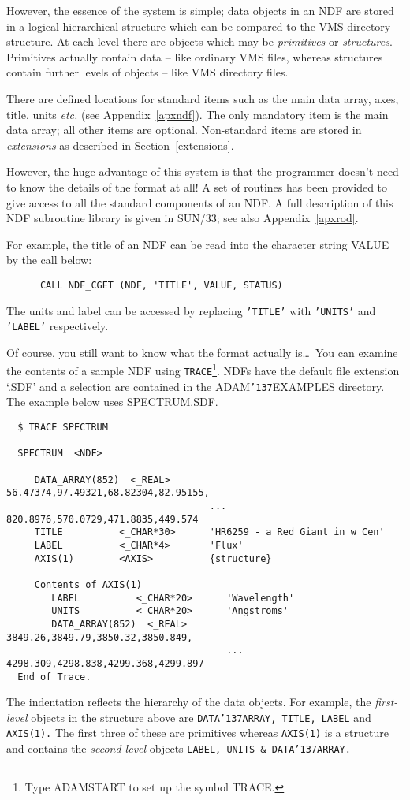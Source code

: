 \documentclass[twoside,11pt]{article}
\renewcommand{\_}{{\tt\char'137}}
\newcommand{\xref}[3]{#1}
\begin{document}
However, the essence of the system is simple; data objects in an NDF 
are stored in a 
logical hierarchical structure which can be compared to the VMS 
directory structure.
At each level there are objects which may be {\sl primitives\/}
or {\sl structures}.
Primitives actually contain data -- like ordinary VMS files, whereas
structures contain further levels of objects -- like VMS directory files.

There are defined locations for standard items such as the main data array,
axes, title, units {\it etc.} (see Appendix~\ref{apxndf}).
The only mandatory item is the main data 
array; all other items are optional. 
Non-standard items are stored in {\sl extensions\/} 
as described in Section~\ref{extensions}.

However, the huge advantage of this system is that the programmer  
doesn't need to know the details of the
format at all!
A set of routines has been provided to give access
to all the standard components of an NDF.
A full description of this NDF subroutine library is given in
\xref{SUN/33}{sun33}{};
see also Appendix~\ref{apxrod}.


For example, the title of an NDF can be read into the character string 
VALUE by the call below:
\begin{verbatim}
      CALL NDF_CGET (NDF, 'TITLE', VALUE, STATUS)
\end{verbatim}
The units and label can be accessed by replacing 
{\tt 'TITLE'} with {\tt 'UNITS'} and {\tt 'LABEL'} respectively.

Of course, you still want to know what the format actually is\ldots\ 
You can examine the contents of a sample NDF 
using {\tt TRACE}\footnote{Type ADAMSTART to set up the symbol TRACE.}. 
NDFs have the default file extension `.SDF' and a selection are
contained in the  ADAM\_EXAMPLES directory.
The example below uses SPECTRUM.SDF.
\begin{verbatim}
  $ TRACE SPECTRUM

  SPECTRUM  <NDF>

     DATA_ARRAY(852)  <_REAL>       56.47374,97.49321,68.82304,82.95155,
                                    ... 820.8976,570.0729,471.8835,449.574
     TITLE          <_CHAR*30>      'HR6259 - a Red Giant in w Cen'
     LABEL          <_CHAR*4>       'Flux'
     AXIS(1)        <AXIS>          {structure}

     Contents of AXIS(1)
        LABEL          <_CHAR*20>      'Wavelength'
        UNITS          <_CHAR*20>      'Angstroms'
        DATA_ARRAY(852)  <_REAL>       3849.26,3849.79,3850.32,3850.849,
                                       ... 4298.309,4298.838,4299.368,4299.897
  End of Trace.
\end{verbatim}
The indentation reflects the hierarchy of the data objects.
For example, the {\sl first-level\/} objects in the structure above are
{\tt  DATA\_ARRAY, TITLE, LABEL} and {\tt AXIS(1).}
The first three of these are primitives whereas
{\tt AXIS(1)} is a structure and contains the {\sl second-level\/}
objects {\tt LABEL, UNITS \& DATA\_ARRAY.}
\end{document}
